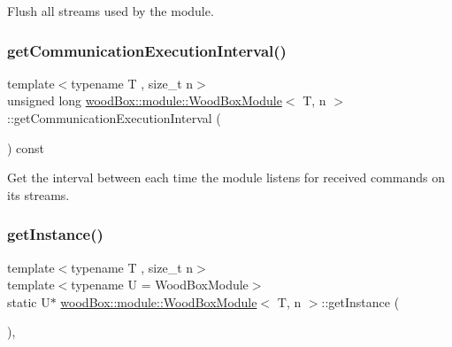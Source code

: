 Flush all streams used by the module. \mbox{\label{classwood_box_1_1module_1_1_wood_box_module_ad4a7b447a617d9c6908ef624cfd2cab4}} 
\subsubsection{\texorpdfstring{get\+Communication\+Execution\+Interval()}{getCommunicationExecutionInterval()}}
{\footnotesize\ttfamily template$<$typename T , size\+\_\+t n$>$ \\
unsigned long \mbox{\hyperlink{classwood_box_1_1module_1_1_wood_box_module}{wood\+Box\+::module\+::\+Wood\+Box\+Module}}$<$ T, n $>$\+::get\+Communication\+Execution\+Interval (\begin{DoxyParamCaption}{ }\end{DoxyParamCaption}) const\hspace{0.3cm}{\ttfamily [inline]}}

Get the interval between each time the module listens for received commands on its streams. \mbox{\label{classwood_box_1_1module_1_1_wood_box_module_a3f13bd3a6318ddf2a7db84f86b198a49}} 
\subsubsection{\texorpdfstring{get\+Instance()}{getInstance()}}
{\footnotesize\ttfamily template$<$typename T , size\+\_\+t n$>$ \\
template$<$typename U  = Wood\+Box\+Module$>$ \\
static U$\ast$ \mbox{\hyperlink{classwood_box_1_1module_1_1_wood_box_module}{wood\+Box\+::module\+::\+Wood\+Box\+Module}}$<$ T, n $>$\+::get\+Instance (\begin{DoxyParamCaption}{ }\end{DoxyParamCaption})\hspace{0.3cm}{\ttfamily [inline]}, {\ttfamily [static]}}

